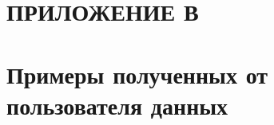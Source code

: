 \section*{ПРИЛОЖЕНИЕ В}
\section*{Примеры полученных от пользователя данных}
\label{chp:application-c}






\pagebreak 
